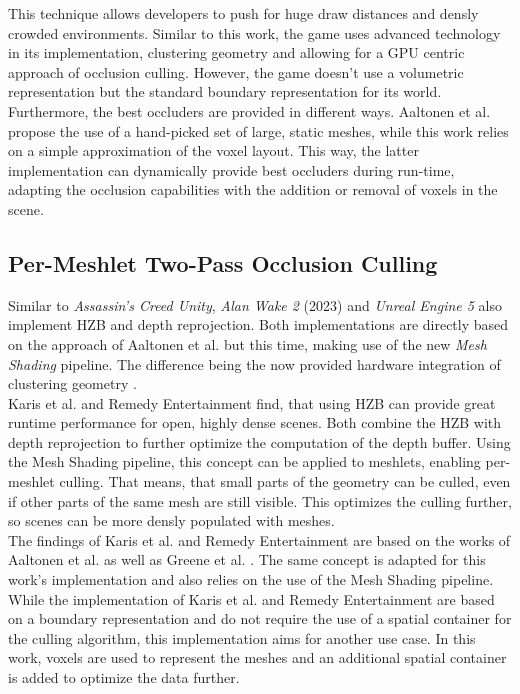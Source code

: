 \noindent
This technique allows developers to push for huge draw distances and densly crowded environments. Similar to this 
work, the game uses advanced technology in its implementation, clustering geometry and allowing for a \ac{GPU} 
centric approach of occlusion culling. However, the game doesn't use a volumetric representation but the standard 
boundary representation for its world. Furthermore, the best occluders are provided in different ways. Aaltonen 
et al. \cite{Aaltonen2015} propose the use of a hand-picked set of large, static meshes, while this work relies 
on a simple approximation of the voxel layout. This way, the latter implementation can dynamically provide best 
occluders during run-time, adapting the occlusion capabilities with the addition or removal of voxels in the scene.

\subsection*{Per-Meshlet Two-Pass Occlusion Culling}

Similar to \emph{Assassin's Creed Unity}, \emph{Alan Wake 2} (2023) and \emph{Unreal Engine 5} also implement \ac{HZB} 
and depth reprojection. Both implementations are directly based on the approach of Aaltonen et al. \cite{Aaltonen2015} 
but this time, making use of the new \emph{Mesh Shading} pipeline. The difference being the now provided hardware 
integration of clustering geometry \cite{Remedy2023,Karis2021}.  \\

\noindent
Karis et al. and Remedy Entertainment find, that using \ac{HZB} can provide great runtime performance for open, 
highly dense scenes. Both combine the \ac{HZB} with depth reprojection to further optimize the computation of the 
depth buffer. Using the Mesh Shading pipeline, this concept can be applied to meshlets, enabling per-meshlet culling. 
That means, that small parts of the geometry can be culled, even if other parts of the same mesh are still visible. 
This optimizes the culling further, so scenes can be more densly populated with meshes.\\

\noindent
The findings of Karis et al. and Remedy Entertainment are based on the works of Aaltonen et al. \cite{Aaltonen2015}
as well as Greene et al. \cite{Greene93,Greene95}. The same concept is adapted for this work's implementation and 
also relies on the use of the Mesh Shading pipeline.\\

\noindent
While the implementation of Karis et al. and Remedy Entertainment are based on a boundary representation and do not 
require the use of a spatial container for the culling algorithm, this implementation aims for another use case. 
In this work, voxels are used to represent the meshes and an additional spatial container is added to optimize the 
data further. 


